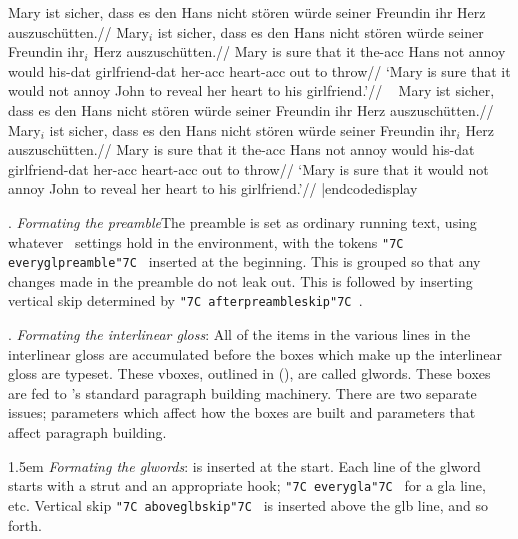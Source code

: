 \framedisplay
\boxglwords
\ex[glspace=1.2em,extraglskip=.5ex,glhangindent=1.5em]
\hsize=4in
\begingl
\glpreamble Mary ist sicher, dass es den Hans nicht st\"oren w\"urde
seiner Freundin ihr Herz auszusch\"utten.//
\gla Mary$_i$ ist sicher, dass es den Hans nicht st\"oren w\"urde
seiner Freundin ihr$_i$ Herz auszusch\"utten.//
\glb Mary is sure that it the-{\sc acc} Hans not annoy would
his-{\sc dat} girlfriend-{\sc dat} her-{\sc acc} heart-{\sc acc} {out to
throw}//
\glft  `Mary is sure that it would not annoy John to reveal her
heart to his girlfriend.'//
\endgl
\xe
\endframedisplay
\codedisplay~
\ex[glspace=1.2em,extraglskip=.5ex,glhangindent=1.5em]
\hsize=4in
\begingl
\glpreamble Mary ist sicher, dass es den Hans nicht st\"oren w\"urde
seiner Freundin ihr Herz auszusch\"utten.//
\gla Mary$_i$ ist sicher, dass es den Hans nicht st\"oren w\"urde
seiner Freundin ihr$_i$ Herz auszusch\"utten.//
\glb Mary is sure that it the-{\sc acc} Hans not annoy would
his-{\sc dat} girlfriend-{\sc dat} her-{\sc acc} heart-{\sc acc} {out to
throw}//
\glft  `Mary is sure that it would not annoy John to reveal her
heart to his girlfriend.'//
\endgl
\xe
|endcodedisplay

\def\parvalue#1{{\tt \char"7C #1\char"7C }}


. {\it Formating the preamble}\enspace The preamble is set
as ordinary running text, using whatever \Tex\ settings hold in the
environment, with the tokens \parvalue{everyglpreamble} inserted at
the beginning.  This is grouped so that any changes made in the
preamble do not leak out.  This is followed by inserting vertical skip
determined by \parvalue{afterpreambleskip}.

\smallskip

. {\it Formating the interlinear gloss}: \enspace All of
the items in the various lines in the interlinear gloss are
accumulated before the boxes which make up the interlinear gloss are
typeset.  These vboxes, outlined in (\lastx), are called glwords.
These boxes are fed to \Tex's standard paragraph building machinery.
There are two separate issues; parameters which affect how the boxes
are built and parameters that affect paragraph building.

\smallskip

\begingroup
\leftskip 1.5em
\parindent=0pt
{\it Formating the glwords}:\enspace \parvalue{everyglword} is
inserted at the start.  Each line of the glword starts with a strut
and an appropriate hook; \parvalue{everygla} for a gla line, etc.
Vertical skip \parvalue{aboveglbskip} is inserted above the glb line,
and so forth.

